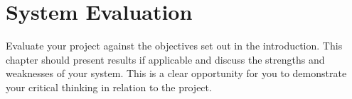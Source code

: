 \chapter{System Evaluation}
Evaluate your project against the objectives set out in the introduction.
This chapter should present results if applicable and discuss the strengths and weaknesses of your system. This is a clear opportunity for you to demonstrate your critical thinking in relation to the project.
